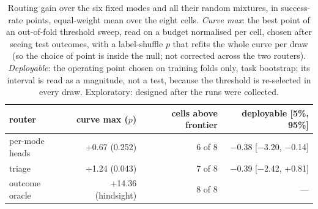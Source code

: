 \begin{table}[t]
\centering\small
\setlength{\tabcolsep}{5pt}
\begin{tabular}{@{}lrrr@{}}
\toprule
router & curve max ($p$) & cells above frontier & deployable [5\%, 95\%] \\
\midrule
per-mode heads & +0.67 (0.252) & 6 of 8 & $-$0.38 [$-$3.20, $-$0.14] \\
triage & +1.24 (0.043) & 7 of 8 & $-$0.39 [$-$2.42, +0.81] \\
outcome oracle & +14.36 (hindsight) & 8 of 8 & --- \\
\bottomrule
\end{tabular}
\caption{Routing gain over the six fixed modes and all their random mixtures, in success-rate points, equal-weight mean over the eight cells. \emph{Curve max}: the best point of an out-of-fold threshold sweep, read on a budget normalised per cell, chosen after seeing test outcomes, with a label-shuffle $p$ that refits the whole curve per draw (so the choice of point is inside the null; not corrected across the two routers). \emph{Deployable}: the operating point chosen on training folds only, task bootstrap; its interval is read as a magnitude, not a test, because the threshold is re-selected in every draw. Exploratory: designed after the runs were collected.}
\label{tab:frontier}
\end{table}
